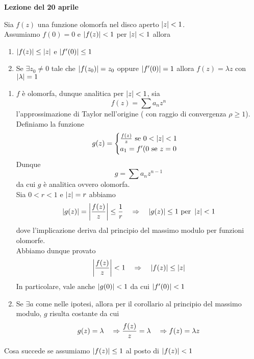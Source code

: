 

\textbf{Lezione del 20 aprile }
\begin{thm}\bianco
Sia $f(z)$ una funzione olomorfa nel disco aperto $\left\vert z \right\vert < 1 $.\\
Assumiamo $f(0)=0$ e $\left\vert f(z) \right\vert<1$ per $\left\vert z \right\vert < 1 $ allora 
\begin{enumerate}
\item $\left\vert f(z) \right\vert\leq \left\vert z \right\vert $ e $\left\vert f'(0) \right\vert\leq 1$
\item Se $\exists z_0\neq 0 $ tale che $\left\vert f(z_0) \right\vert =z_0$ oppure $\left\vert f'(0) \right\vert=1$ allora $f(z) = \lambda z $ con $\left\vert \lambda \right\vert =1$
\end{enumerate}
\proof \bbianco
\begin{enumerate}
\item $f$ \`e olomorfa, dunque analitica per $\left\vert z \right\vert <1$, sia 
$$ f(z) = \sum a_n z^n$$
l'approssimazione di Taylor nell'origine  ( con raggio di convergenza $\rho\geq 1$).\\
Definiamo la funzione 
$$ g(z) =\begin{cases}\frac{f(z)}{z} \text{ se }  0<\left\vert z \right\vert <1 \\ 
a_1 = f'(0 \text{ se } z=0
\end{cases}$$
Dunque 
$$ g=\sum a_n z^{n-1}$$ 
da cui $g$ \`e analitica ovvero olomorfa.\\
Sia $0<r<1$ e $\left\vert z \right\vert=r$ abbiamo 
$$ \left\vert g(z) \right\vert = \left\vert \frac{f(z)}{z} \right\vert \leq \frac{1}{r} \quad \Rightarrow \quad \left\vert g(z) \right\vert \leq 1 \text{ per } \left\vert z \right\vert <1 $$
dove l'implicazione deriva dal principio del massimo modulo per funzioni olomorfe.\\
Abbiamo dunque provato 
$$ \left\vert \frac{f(z)}{z} \right\vert< 1\quad \Rightarrow \quad \left\vert f(z) \right\vert\leq \left\vert z \right\vert$$
In particolare, vale anche $\left\vert g(0) \right\vert<1$ da cui $\left\vert f'(0) \right\vert<1$
\item Se $\exists a$ come nelle ipotesi, allora per il corollario al principio del massimo modulo, $g$ risulta costante da cui 
$$ g(z) = \lambda \quad \Rightarrow \frac{f(z)}{z} =\lambda \quad \Rightarrow f(z) = \lambda z$$
\end{enumerate}
\end{thm}
\begin{ex}Cosa succede se assumiamo $\left\vert f(z) \right\vert\leq 1$ al posto di $\left\vert f(z) \right\vert <1$ 
\end{ex}
\newpage
